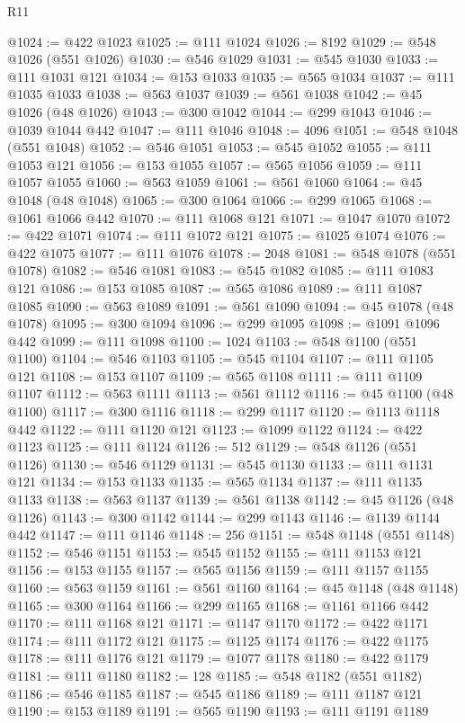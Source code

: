 \begin{lexlean}{R11}
\begin{coremodule}
{{{{{{{{{{{{{{{{{{{{{{{{{{{{{{{{{{{{{{{{{{{{{{{{{{{{{{{{{{{{{{{{{{{{{{{{{{{{{{{{{{@1024 := @422 @1023
@1025 := @111 @1024
@1026 := 8192
@1029 := @548 @1026 (@551 @1026)
@1030 := @546 @1029
@1031 := @545 @1030
@1033 := @111 @1031 @121
@1034 := @153 @1033
@1035 := @565 @1034
@1037 := @111 @1035 @1033
@1038 := @563 @1037
@1039 := @561 @1038
@1042 := @45 @1026 (@48 @1026)
@1043 := @300 @1042
@1044 := @299 @1043
@1046 := @1039 @1044 @442
@1047 := @111 @1046
@1048 := 4096
@1051 := @548 @1048 (@551 @1048)
@1052 := @546 @1051
@1053 := @545 @1052
@1055 := @111 @1053 @121
@1056 := @153 @1055
@1057 := @565 @1056
@1059 := @111 @1057 @1055
@1060 := @563 @1059
@1061 := @561 @1060
@1064 := @45 @1048 (@48 @1048)
@1065 := @300 @1064
@1066 := @299 @1065
@1068 := @1061 @1066 @442
@1070 := @111 @1068 @121
@1071 := @1047 @1070
@1072 := @422 @1071
@1074 := @111 @1072 @121
@1075 := @1025 @1074
@1076 := @422 @1075
@1077 := @111 @1076
@1078 := 2048
@1081 := @548 @1078 (@551 @1078)
@1082 := @546 @1081
@1083 := @545 @1082
@1085 := @111 @1083 @121
@1086 := @153 @1085
@1087 := @565 @1086
@1089 := @111 @1087 @1085
@1090 := @563 @1089
@1091 := @561 @1090
@1094 := @45 @1078 (@48 @1078)
@1095 := @300 @1094
@1096 := @299 @1095
@1098 := @1091 @1096 @442
@1099 := @111 @1098
@1100 := 1024
@1103 := @548 @1100 (@551 @1100)
@1104 := @546 @1103
@1105 := @545 @1104
@1107 := @111 @1105 @121
@1108 := @153 @1107
@1109 := @565 @1108
@1111 := @111 @1109 @1107
@1112 := @563 @1111
@1113 := @561 @1112
@1116 := @45 @1100 (@48 @1100)
@1117 := @300 @1116
@1118 := @299 @1117
@1120 := @1113 @1118 @442
@1122 := @111 @1120 @121
@1123 := @1099 @1122
@1124 := @422 @1123
@1125 := @111 @1124
@1126 := 512
@1129 := @548 @1126 (@551 @1126)
@1130 := @546 @1129
@1131 := @545 @1130
@1133 := @111 @1131 @121
@1134 := @153 @1133
@1135 := @565 @1134
@1137 := @111 @1135 @1133
@1138 := @563 @1137
@1139 := @561 @1138
@1142 := @45 @1126 (@48 @1126)
@1143 := @300 @1142
@1144 := @299 @1143
@1146 := @1139 @1144 @442
@1147 := @111 @1146
@1148 := 256
@1151 := @548 @1148 (@551 @1148)
@1152 := @546 @1151
@1153 := @545 @1152
@1155 := @111 @1153 @121
@1156 := @153 @1155
@1157 := @565 @1156
@1159 := @111 @1157 @1155
@1160 := @563 @1159
@1161 := @561 @1160
@1164 := @45 @1148 (@48 @1148)
@1165 := @300 @1164
@1166 := @299 @1165
@1168 := @1161 @1166 @442
@1170 := @111 @1168 @121
@1171 := @1147 @1170
@1172 := @422 @1171
@1174 := @111 @1172 @121
@1175 := @1125 @1174
@1176 := @422 @1175
@1178 := @111 @1176 @121
@1179 := @1077 @1178
@1180 := @422 @1179
@1181 := @111 @1180
@1182 := 128
@1185 := @548 @1182 (@551 @1182)
@1186 := @546 @1185
@1187 := @545 @1186
@1189 := @111 @1187 @121
@1190 := @153 @1189
@1191 := @565 @1190
@1193 := @111 @1191 @1189
}}}}}}}}}}}}}}}}}}}}}}}}}}}}}}}}}}}}}}}}}}}}}}}}}}}}}}}}}}}}}}}}}}}}}}}}}}}}}}}}}}
\end{coremodule}
\end{lexlean}
